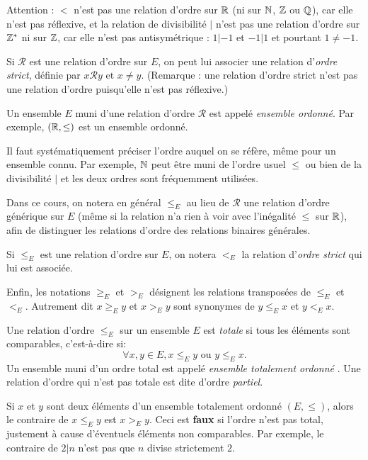 Attention : $<$ n'est pas une relation d'ordre sur $\mathbb{R}$ (ni sur $\mathbb{N}$, $\mathbb{Z}$ ou $\mathbb{Q}$), car elle n'est pas réflexive, et la relation de divisibilité $|$ n'est pas une relation d'ordre sur $\mathbb{Z}^*$ ni sur $\mathbb{Z}$, car elle n'est pas antisymétrique : $1|-1$ et $-1|1$ et pourtant $1\neq -1$.

\begin{definition}
Si ${\mathcal R}$ est une relation d'ordre sur $E$, on peut lui associer une relation d'\emph{ordre strict}, définie par \og$ x{\mathcal R}y\text{ et }x\neq y$\fg. (Remarque : une relation d'ordre strict n'est pas une relation d'ordre puisqu'elle n'est pas réflexive.)
\end{definition}

Un ensemble $E$ muni d'une relation d'ordre ${\mathcal R}$ est appelé \emph{ensemble ordonné}. Par exemple, $(\mathbb{R}, \leq)$ est un ensemble ordonné.

Il faut systématiquement préciser l'ordre auquel on se réfère, même pour un ensemble \og connu\fg. Par exemple, $\mathbb{N}$ peut être muni de l'ordre usuel $\leq$ ou bien de la divisibilité $|$ et les deux ordres sont fréquemment utilisées.

Dans ce cours, on notera en général $\leq_E$ au lieu de ${\mathcal R}$ une relation d'ordre générique sur $E$ (même si la relation n'a rien à voir avec l'inégalité $\leq$ sur $\mathbb{R}$), afin de distinguer les relations d'ordre des relations binaires générales.

Si $\leq_E$ est une relation d'ordre sur $E$, on notera $<_E$ la relation d'\emph{ordre strict} qui lui est associée.

Enfin, les notations $\geq_E$ et $>_E$ désignent les relations transposées de $\leq_E$ et $<_E$. Autrement dit  $x \geq_E y$ et $x >_E y$ sont synonymes de $y \leq_E x$ et $y <_E x$.

\begin{definition}
Une relation d'ordre $\leq_E$ sur un ensemble $E$ est \emph{totale} si tous les éléments sont comparables, c'est-à-dire si:
\[ \forall x, y\in E, x\leq_Ey\text{ ou } y\leq_E x.\]
Un ensemble muni d'un ordre total est appelé \emph{ensemble totalement ordonné} . Une relation d'ordre qui n'est pas totale est dite d'ordre \emph{partiel}.
\end{definition}

\begin{remarque}
Si $x$ et $y$ sont deux éléments d'un ensemble totalement ordonné $(E,\leq)$, alors le contraire de $x\leq_E y$ est $x>_E y$. Ceci est \textbf{faux} si l'ordre n'est pas total, justement à cause d'éventuels éléments non comparables. Par exemple, le contraire de $2|n$ n'est pas que $n$ divise strictement $2$.
\end{remarque}

